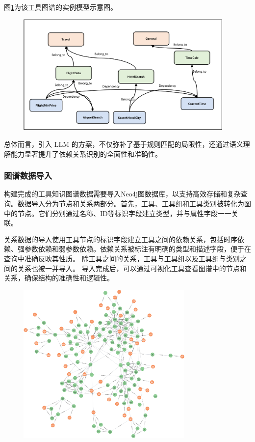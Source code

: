 图\ref{fig:ch3-knowledge-graph-instance-model}为该工具图谱的实例模型示意图。

\begin{figure}[H]
    \vspace{1em}
    \centering
    \setlength{\abovecaptionskip}{10pt} %
    \includegraphics[height=6cm]{../assets/图谱实例模型.png}
    \label{fig:ch3-knowledge-graph-instance-model}
\end{figure}

总体而言，引入 LLM 的方案，不仅弥补了基于规则匹配的局限性，还通过语义理解能力显著提升了依赖关系识别的全面性和准确性。

\subsubsection{图谱数据导入}

构建完成的工具知识图谱数据需要导入Neo4j图数据库，以支持高效存储和复杂查询。数据导入分为节点和关系两部分。首先，工具、工具组和工具类别被转化为图中的节点。它们分别通过名称、ID等标识字段建立类型，并与属性字段一一关联。

关系数据的导入使用工具节点的标识字段建立工具之间的依赖关系，包括时序依赖、强参数依赖和弱参数依赖。依赖关系被标注有明确的类型和描述字段，便于在查询中准确反映其性质。
除工具之间的关系，工具与工具组以及工具组与类别之间的关系也被一并导入。
导入完成后，可以通过可视化工具查看图谱中的节点和关系，确保结构的准确性和逻辑性。

\begin{figure}[H]
    \vspace{1em}
    \centering
    \setlength{\abovecaptionskip}{10pt} %
    \includegraphics[height=8cm]{../assets/Neo4j工具图1126-150nodes.png}
    \label{fig:ch3-neo4j}
\end{figure}

